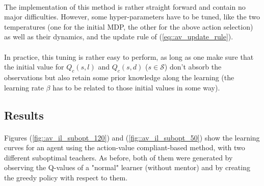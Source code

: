 \documentclass[a4paper]{report}
\begin{document}
{{{{				\paragraph{} The implementation of this method is rather straight forward and contain no major difficulties. However, some hyper-parameters have to be tuned, like the two temperatures (one for the initial MDP, the other for the above action selection) as well as their dynamics, and the update rule of (\ref{eq::av_update_rule}). 
				
				\paragraph{} In practice, this tuning is rather easy to perform, as long as one make sure that the initial value for $Q_c(s,l)$ and $Q_c(s,d)$ ($s\in\mathcal{S}$) don't absorb the observations but also retain some prior knowledge along the learning (the learning rate $\beta$ has to be related to those initial values in some way). 
			}
			\subsection{Results}
			{
				 \paragraph{} Figures (\ref{fig::av_il_subopt_120}) and (\ref{fig::av_il_subopt_50}) show the learning curves for an agent using the action-value compliant-based method, with two different suboptimal teachers. As before, both of them were generated by observing the Q-values of a "normal" learner (without mentor) and by creating the greedy policy with respect to them.
				 
}}}}
\end{document}

